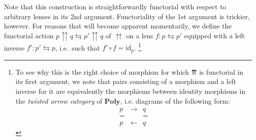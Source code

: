 \documentclass[
  11pt,
  oneside,
  article]{memoir}
\theoremstyle{definition}
\theoremstyle{plain}
\newcommand{\Cat}[1]{\mathbf{#1}}%
\newcommand{\poly}{\Cat{Poly}}
\newcommand{\0}{\textsf{0}}
\newcommand{\1}{\tn{\textsf{1}}}
\begin{document}
Note that this construction is straightforwardly functorial with respect
to arbitrary lenses in its 2nd argument. Functoriality of the 1st
argument is trickier, however. For reasons that will become apparent
momentarily, we define the functorial action
\(p \upuparrows q \leftrightarrows p' \upuparrows q\) of \(\upuparrows\)
on a lens \(f : p \leftrightarrows p'\) equipped with a left inverse
\(f' : p' \leftrightarrows p\), i.e.~such that
\(f' \circ f = \text{id}_p\).
\footnote{To see why this is the right choice of morphism for which ⇈ is functorial in its first argument, we note that pairs consisting of a morphism and a left inverse for it are equivalently the morphisms between identity morphisms in the \emph{twisted arrow category} of $\poly$, i.e. diagrams of the following form: $$
\begin{array}{ccc}
p & \to & q\\
= & & =\\
p & \leftarrow & q
\end{array}
$$}
\end{document}
